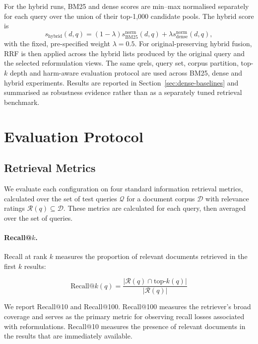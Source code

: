 \documentclass[a4paper,fleqn]{cas-dc}
\begin{document}
For the hybrid runs, BM25 and dense scores are min--max normalised
separately for each query over the union of their top-1,000
candidate pools. The hybrid score is
\begin{equation}
    s_{\text{hybrid}}(d,q) =
    (1-\lambda)s_{\text{BM25}}^{\text{norm}}(d,q)
    + \lambda s_{\text{dense}}^{\text{norm}}(d,q),
\end{equation}
with the fixed, pre-specified weight $\lambda=0.5$. For
original-preserving hybrid fusion, RRF is then applied across the
hybrid lists produced by the original query and the selected
reformulation views. The same qrels, query set, corpus partition,
top-$k$ depth and harm-aware evaluation protocol are used across
BM25, dense and hybrid experiments. Results are reported in
Section~\ref{sec:dense-baselines} and summarised as robustness
evidence rather than as a separately tuned retrieval benchmark.

\section{Evaluation Protocol}
\label{sec:evaluation-protocol}

\subsection{Retrieval Metrics}

We evaluate each configuration on four standard
information retrieval metrics, calculated over
the set of test queries $\mathcal{Q}$ for a
document corpus $\mathcal{D}$ with relevance
ratings $\mathcal{R}(q) \subseteq \mathcal{D}$.
These metrics are calculated for each query,
then averaged over the set of queries.

\paragraph{Recall@$k$.}
Recall at rank $k$ measures the proportion of relevant documents
retrieved in the first $k$ results:

\begin{equation}
    \text{Recall@}k(q) =
    \frac{\left|\mathcal{R}(q) \cap
    \text{top-}k(q)\right|}
    {\left|\mathcal{R}(q)\right|}
\end{equation}

We report Recall@10 and Recall@100. Recall@100
measures the retriever’s broad coverage and serves
as the primary metric for observing recall losses
associated with reformulations. Recall@10 measures
the presence of relevant documents in the results
that are immediately available.
\end{document}
